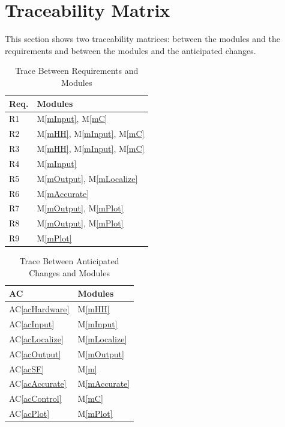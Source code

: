 \documentclass[12pt, titlepage]{article}
\newcommand{\acref}[1]{AC\ref{#1}}
\newcommand{\mref}[1]{M\ref{#1}}
\begin{document}

\section{Traceability Matrix} \label{SecTM}

This section shows two traceability matrices: between the modules and the
requirements and between the modules and the anticipated changes.

\begin{table}[H]
\centering
\begin{tabular}{p{} p{}}
\toprule
\textbf{Req.} & \textbf{Modules}\\
\midrule
R1 & \mref{mInput}, \mref{mC}\\
R2 & \mref{mHH}, \mref{mInput}, \mref{mC}\\
R3 & \mref{mHH}, \mref{mInput}, \mref{mC}\\
R4 & \mref{mInput}\\
R5 & \mref{mOutput}, \mref{mLocalize}\\
R6 & \mref{mAccurate}\\
R7 & \mref{mOutput}, \mref{mPlot}\\
R8 & \mref{mOutput}, \mref{mPlot}\\
R9 & \mref{mPlot}\\
\bottomrule
\end{tabular}
\caption{Trace Between Requirements and Modules}
\label{TblRT}
\end{table}

\begin{table}[H]
\centering
\begin{tabular}{p{} p{}}
\toprule
\textbf{AC} & \textbf{Modules}\\
\midrule
\acref{acHardware} & \mref{mHH}\\
\acref{acInput} & \mref{mInput}\\
\acref{acLocalize} & \mref{mLocalize}\\
\acref{acOutput} & \mref{mOutput}\\
\acref{acSF} & \mref{m}\\
\acref{acAccurate} & \mref{mAccurate}\\
\acref{acControl} & \mref{mC}\\
\acref{acPlot} & \mref{mPlot}\\
\bottomrule
\end{tabular}
\caption{Trace Between Anticipated Changes and Modules}
\label{TblACT}
\end{table}
\end{document}

